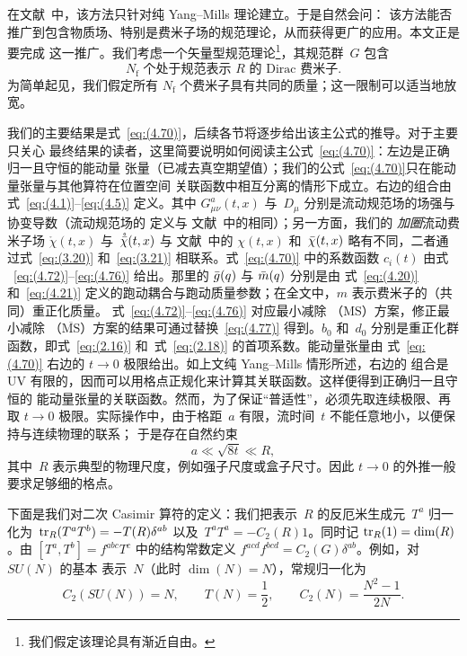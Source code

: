 在文献~\cite{Suzuki:2013gza}中，该方法只针对纯 Yang--Mills 理论建立。于是自然会问：
该方法能否推广到包含物质场、特别是费米子场的规范理论，从而获得更广的应用。本文正是要完成
这一推广。我们考虑一个矢量型规范理论\footnote{我们假定该理论具有渐近自由。}，其规范群~$G$
包含
\begin{equation}
   \text{$N_{\mathrm{f}}$ 个处于规范表示 $R$ 的 Dirac 费米子}.
\label{eq:(1.1)}
\end{equation}
为简单起见，我们假定所有 $N_{\mathrm{f}}$ 个费米子具有共同的质量；这一限制可以适当地放宽。

我们的主要结果是式~\eqref{eq:(4.70)}，后续各节将逐步给出该主公式的推导。对于主要只关心
最终结果的读者，这里简要说明如何阅读主公式~\eqref{eq:(4.70)}：左边是正确归一且守恒的能动量
张量（已减去真空期望值）；我们的公式~\eqref{eq:(4.70)}只在能动量张量与其他算符在位置空间
关联函数中相互分离的情形下成立。右边的组合由式~\eqref{eq:(4.1)}--\eqref{eq:(4.5)}
定义。其中 $G_{\mu\nu}^a(t,x)$ 与~$D_\mu$ 分别是流动规范场的场强与协变导数（流动规范场的
定义与
文献~\cite{Luscher:2010iy,Luscher:2011bx,Luscher:2013cpa}中的相同）；另一方面，我们的
\emph{加圈\/}流动费米子场
$\mathring{{\chi}}(t,x)$ 与~$\mathring{\Bar{\chi}}(t,x)$ 与
文献~\cite{Luscher:2013cpa}中的 $\chi(t,x)$
和~$\Bar{\chi}(t,x)$ 略有不同，二者通过式~\eqref{eq:(3.20)}
和~\eqref{eq:(3.21)} 相联系。式~\eqref{eq:(4.70)} 中的系数函数 $c_i(t)$ 由式%
~\eqref{eq:(4.72)}--\eqref{eq:(4.76)} 给出。那里的 $\Bar{g}(q)$ 与
$\Bar{m}(q)$ 分别是由
式~\eqref{eq:(4.20)} 和~\eqref{eq:(4.21)} 定义的跑动耦合与跑动质量参数；在全文中，$m$
表示费米子的（共同）重正化质量。
式~\eqref{eq:(4.72)}--\eqref{eq:(4.76)} 对应最小减除
（$\text{MS}$）方案，修正最小减除
（$\overline{\text{MS}}$）方案的结果可通过替换~\eqref{eq:(4.77)} 得到。$b_0$
和~$d_0$ 分别是重正化群函数，即式~\eqref{eq:(2.16)}
和~式~\eqref{eq:(2.18)} 的首项系数。能动量张量由
式~\eqref{eq:(4.70)} 右边的 $t\to0$ 极限给出。如上文纯 Yang--Mills 情形所述，右边的
组合是 UV 有限的，因而可以用格点正规化来计算其关联函数。这样便得到正确归一且守恒的
能动量张量的关联函数。然而，为了保证“普适性”，必须先取连续极限、再取 $t\to0$
极限。实际操作中，由于格距~$a$ 有限，流时间~$t$ 不能任意地小，以便保持与连续物理的联系；
于是存在自然约束
\begin{equation}
   a\ll\sqrt{8t}\ll R,
\label{eq:(1.2)}
\end{equation}
其中~$R$ 表示典型的物理尺度，例如强子尺度或盒子尺寸。因此 $t\to0$
的外推一般要求足够细的格点。

下面是我们对二次 Casimir 算符的定义：我们把表示~$R$ 的反厄米生成元~$T^a$
归一化为~$\tr_R(T^aT^b)=-T(R)\delta^{ab}$ 以及~$T^aT^a=-C_2(R)1$。同时记
$\tr_R(1)=\dim(R)$。由 $[T^a,T^b]=f^{abc}T^c$ 中的结构常数定义
$f^{acd}f^{bcd}=C_2(G)\delta^{ab}$。例如，对 $SU(N)$ 的基本
表示~$N$（此时 $\dim(N)=N$），常规归一化为
\begin{equation}
   C_2(SU(N))=N,\qquad T(N)=\frac{1}{2},\qquad
   C_2(N)=\frac{N^2-1}{2N}.
\label{eq:(1.3)}
\end{equation}
